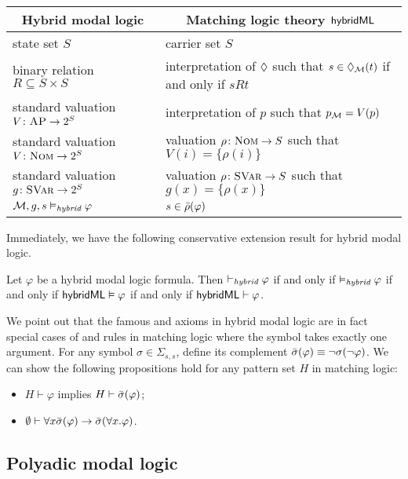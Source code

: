 \documentclass{amsart}
\begin{document}
\begin{center}
\begin{tabular}{ll}
\multicolumn{1}{c}{Hybrid modal logic} & 
\multicolumn{1}{c}{Matching logic theory $\mathsf{hybridML}$}
\\\hline
state set $S$ & carrier set $S$
\\
binary relation $R \subseteq S \times S$ & interpretation of ${\lozenge}$ such that
                      $s \in {\lozenge}_{\mathcal{M}} (t)$ if and only if $s R t$
\\
standard valuation $V \colon \textsc{AP} \to 2^{S}$
& interpretation of $p$ such that $p_{\mathcal{M}} = V(p)$
\\
standard valuation $V \colon \textnormal{\textsc{Nom}} \to 2^{S}$
& valuation $\rho \colon \textnormal{\textsc{Nom}} \to S$ such that
$V(i) = \{ \rho(i) \}$
\\
standard valuation $g \colon \textnormal{\textsc{SVar}} \to 2^{S}$
& valuation $\rho \colon \textnormal{\textsc{SVar}} \to S$ such that
$g(x) = \{ \rho(x) \}$
\\
$\mathcal{M},g,s \vDash_{\textit{hybrid}} \varphi$
& $s \in \bar{\rho}(\varphi)$
\end{tabular}
\end{center}
Immediately, we have the following conservative extension result for hybrid modal logic.
\begin{theorem}
Let $\varphi$ be a hybrid modal logic formula.
Then
$\vdash_{\textit{hybrid}} \varphi$ if and only if
$\vDash_{\textit{hybrid}} \varphi$ if and only if 
$\mathsf{hybridML} \vDash \varphi$ if and only if
$\mathsf{hybridML} \vdash \varphi$.
\end{theorem}

We point out that the famous  and  axioms
in hybrid modal logic
are in fact special cases
of \propagationbottom and \propagationexists rules
in matching logic where the symbol takes exactly one argument.
For any symbol $\sigma \in \Sigma_{s,s}$,
define its complement $\bar{\sigma} (\varphi) \equiv \neg \sigma(\neg \varphi)$.
We can show the following propositions hold for
any pattern set $H$ in matching logic:
\begin{itemize}
\item $H \vdash \varphi$ implies $H \vdash \bar{\sigma}(\varphi)$;
\item $\emptyset \vdash \forall x  \bar{\sigma}(\varphi) \to \bar{\sigma}(\forall x . \varphi)$.
\end{itemize}

\subsection{Polyadic modal logic}
\end{document}
